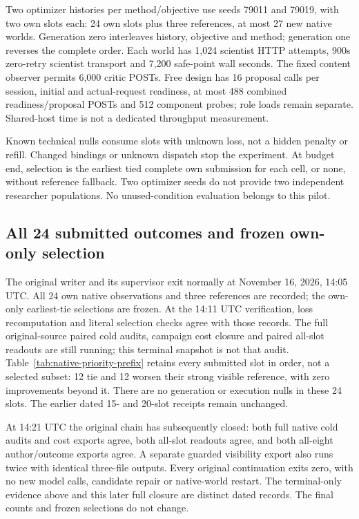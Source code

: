 Two optimizer histories per method/objective use seeds 79011 and 79019, with
two own slots each: 24 own slots plus three references, at most 27 new native
worlds. Generation zero interleaves history, objective and method; generation
one reverses the complete order. Each world has 1,024 scientist HTTP attempts,
900s zero-retry scientist transport and 7,200 safe-point wall seconds. The
fixed content observer permits 6,000 critic POSTs. Free design has 16 proposal
calls per session, initial and actual-request readiness, at most 488 combined
readiness/proposal POSTs and 512 component probes; role loads remain separate.
Shared-host time is not a dedicated throughput measurement.

Known technical nulls consume slots with unknown loss, not a hidden penalty
or refill. Changed bindings or unknown dispatch stop the experiment. At budget
end, selection is the earliest tied complete own submission for each cell,
or none, without reference fallback. Two optimizer seeds do not provide two
independent researcher populations. No unused-condition evaluation belongs
to this pilot.

\subsection{All 24 submitted outcomes and frozen own-only selection}
\label{sec:native-priority-prefix}
The original writer and its supervisor exit normally at November 16, 2026,
14:05 UTC. All 24 own native observations and three references are recorded;
the own-only earliest-tie selections are frozen. At the 14:11 UTC verification,
loss recomputation and literal selection checks agree with those records.
The full original-source paired cold audits, campaign cost closure and paired
all-slot readouts are still running; this terminal snapshot is not that audit.
Table~\ref{tab:native-priority-prefix} retains every submitted slot in order,
not a selected subset: 12 tie and 12 worsen their strong visible reference,
with zero improvements beyond it. There are no generation or execution nulls
in these 24 slots. The earlier dated 15- and 20-slot receipts remain unchanged.

At 14:21 UTC the original chain has subsequently closed: both full native cold
audits and cost exports agree, both all-slot readouts agree, and both all-eight
author/outcome exports agree. A separate guarded visibility export also runs
twice with identical three-file outputs. Every original continuation exits
zero, with no new model calls, candidate repair or native-world restart.
The terminal-only evidence above and this later full closure are distinct
dated records. The final counts and frozen selections do not change.


